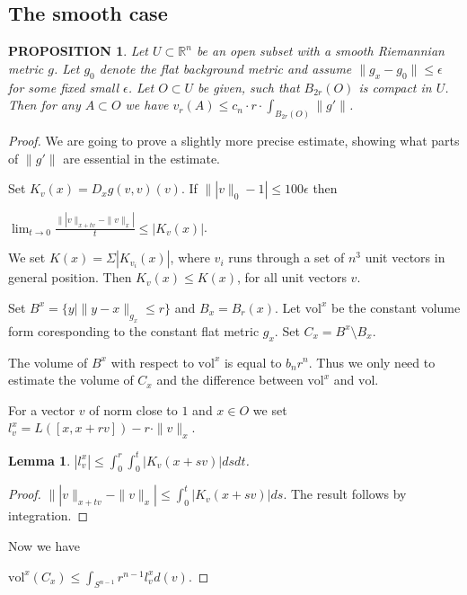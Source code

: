 \documentclass[12pt,leqno]{amsart}
\numberwithin{equation}{section}
\newtheorem{lem}[thm]{Lemma}
\newtheorem{prop}[thm]{PROPOSITION}
\theoremstyle{definition}
\theoremstyle{remark}
\newcommand{\vol}{\mathrm{vol}}
\newcommand{\R}{\mathbb{R}}
\begin{document}
\subsection{The smooth case}

\begin{prop}\label{prop-smooth}
Let $U\subset \R^n$ be an open subset with a smooth Riemannian
metric $g$. Let $g_0$ denote the flat background metric and assume $\|g_x-g_0\| \leq \epsilon$ for some fixed small
$\epsilon$.   Let $O\subset U$ be given, such that $B_{2r} (O)$ is compact in $U$.
Then for any $A\subset O$ we have $v_r (A) \leq c_n \cdot r \cdot \int _{B_{2r} ( O)} \|g'\|$.
\end{prop}



 \begin{proof}
 We are going to prove a slightly more precise estimate, showing what parts of $\|g'\|$ are essential in the estimate.


 Set $K_v (x) = D_x g(v,v) (v)$.  If $\||v\|_0 -1| \leq 100\epsilon$  then

 $\lim _{t\to 0} \frac {\||v\|_{x+tv} - \|v\| _x|} t \leq |K_v (x)|$.

 We set $K(x)= \Sigma |K_{v_i}(x)|$, where $v_i$ runs through a set of $n^3$ unit vectors in general position.
 Then $K_v(x) \leq K (x)$, for all unit vectors $v$.

 Set $B^x = \{ y | \|y-x\| _{g_x} \leq r \}$ and $B_x = B_r (x)$.  Let $\vol ^x$ be the constant
 volume form coresponding to the constant flat metric $g_x$.
   Set $C_x = B^x \setminus B_x$.

   The volume of $B^x$ with respect to $\vol ^x$ is equal to $b_n r^n$. Thus we only need to estimate
  the volume of $C_x$ and the difference between $\vol ^x$ and $\vol$.

 For a vector $v$ of norm close to $1$ and $x\in O$ we set
 $l_v ^x = L ([x,x+rv]) - r \cdot \| v\| _x$.

 \begin{lem}
 $|l_v ^x| \leq \int _0 ^r  \int _0 ^t | K_v (x+sv)| ds dt$.
 \end{lem}


 \begin{proof}
 $\||v\|_{x+tv} -\|v\| _x| \leq \int _0 ^t  |K_v (x+sv)| ds$. The result follows by integration.
  \end{proof}


   Now we have

   $\vol ^x (C_x) \leq \int _{S^{n-1}} r^{n-1} l^x _v d(v) $.



\end{proof}
\end{document}
